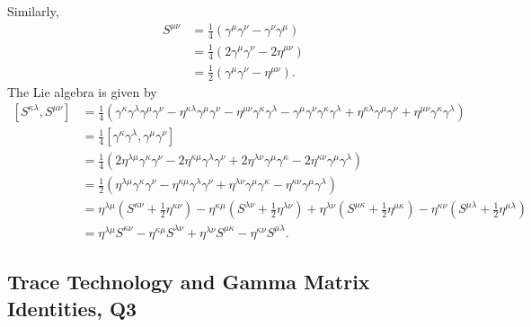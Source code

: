 \begin{solution}
    Similarly,
    \begin{equation}
        \begin{aligned}
            S^{\mu\nu} &= \frac{1}{4}(\gamma^\mu\gamma^\nu -\gamma^\nu\gamma ^\mu  )\\
            &=\frac{1}{4}(2\gamma^\mu\gamma^\nu - 2\eta^{\mu\nu})\\
            &=\frac{1}{2}(\gamma^\mu\gamma^\nu - \eta^{\mu\nu}).
        \end{aligned}
    \end{equation}
    The Lie algebra is given by
        \begin{equation}
    \begin{aligned}
        [S^{\kappa\lambda},S^{\mu\nu}] &= \frac{1}{4}(\gamma^\kappa\gamma^\lambda\gamma^\mu\gamma^\nu -\eta^{\kappa\lambda}\gamma^\mu\gamma^\nu-\eta^{\mu\nu}\gamma^\kappa\gamma^\lambda - \gamma^\mu\gamma^\nu\gamma^\kappa\gamma^\lambda+\eta^{\kappa\lambda}\gamma^\mu\gamma^\nu+\eta^{\mu\nu}\gamma^\kappa\gamma^\lambda)\\
        &=\frac{1}{4}[\gamma^\kappa\gamma^\lambda,\gamma^\mu\gamma^\nu]\\
        &=\frac{1}{4}\left(2\eta^{\lambda\mu}\gamma^\kappa\gamma^\nu - 2\eta^{\kappa\mu}\gamma^\lambda\gamma^\nu + 2\eta^{\lambda\nu}\gamma^\mu\gamma^\kappa - 2\eta^{\kappa\nu}\gamma^\mu\gamma^\lambda\right)\\
        &=\frac{1}{2}\left(\eta^{\lambda\mu}\gamma^\kappa\gamma^\nu - \eta^{\kappa\mu}\gamma^\lambda\gamma^\nu + \eta^{\lambda\nu}\gamma^\mu\gamma^\kappa - \eta^{\kappa\nu}\gamma^\mu\gamma^\lambda\right)\\
        &=\eta^{\lambda\mu}\left(S^{\kappa\nu}+\tfrac{1}{2}\eta^{\kappa\nu}\right) - \eta^{\kappa\mu}\left(S^{\lambda\nu}+\tfrac{1}{2}\eta^{\lambda\nu}\right) + \eta^{\lambda\nu}\left(S^{\mu\kappa}+\tfrac{1}{2}\eta^{\mu\kappa}\right) - \eta^{\kappa\nu}\left(S^{\mu\lambda}+\tfrac{1}{2}\eta^{\mu\lambda}\right)\\
        &= \eta^{\lambda\mu}S^{\kappa\nu} - \eta^{\kappa\mu}S^{\lambda\nu} + \eta^{\lambda\nu}S^{\mu\kappa} - \eta^{\kappa\nu}S^{\mu\lambda}.
    \end{aligned}
    \end{equation}
\end{solution}

\subsection{Trace Technology and Gamma Matrix Identities, Q3}

